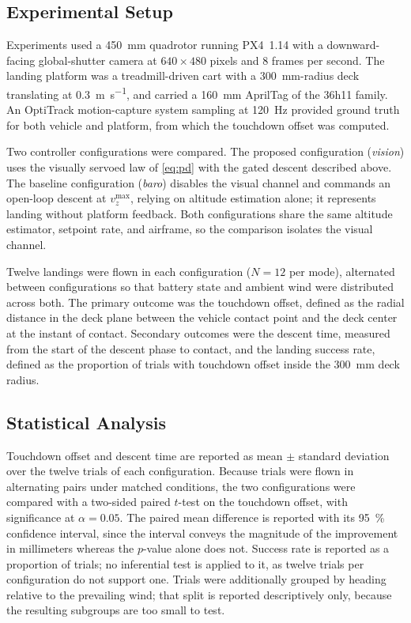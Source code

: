 \subsection{Experimental Setup}

Experiments used a \SI{450}{\milli\meter} quadrotor running PX4~1.14 with a
downward-facing global-shutter camera at $640 \times 480$ pixels and 8 frames
per second. The landing platform was a treadmill-driven cart with a
\SI{300}{\milli\meter}-radius deck translating at \SI{0.3}{\meter\per\second}, and
carried a \SI{160}{\milli\meter} AprilTag of the 36h11 family. An OptiTrack
motion-capture system sampling at \SI{120}{\hertz} provided ground truth for
both vehicle and platform, from which the touchdown offset was computed.

Two controller configurations were compared. The proposed configuration
(\textit{vision}) uses the visually servoed law of \eqref{eq:pd} with the gated
descent described above. The baseline configuration (\textit{baro}) disables the
visual channel and commands an open-loop descent at $v^{\max}_{z}$, relying on
altitude estimation alone; it represents landing without platform feedback. Both
configurations share the same altitude estimator, setpoint rate, and airframe, so
the comparison isolates the visual channel.

Twelve landings were flown in each configuration ($N=12$ per mode), alternated
between configurations so that battery state and ambient wind were distributed
across both. The primary outcome was the touchdown offset, defined as the radial
distance in the deck plane between the vehicle contact point and the deck center
at the instant of contact. Secondary outcomes were the descent time, measured
from the start of the descent phase to contact, and the landing success rate,
defined as the proportion of trials with touchdown offset inside the
\SI{300}{\milli\meter} deck radius.

\subsection{Statistical Analysis}

Touchdown offset and descent time are reported as mean $\pm$ standard deviation
over the twelve trials of each configuration. Because trials were flown in
alternating pairs under matched conditions, the two configurations were compared
with a two-sided paired $t$-test on the touchdown offset, with significance at
$\alpha = 0.05$. The paired mean difference is reported with its
\SI{95}{\percent} confidence interval, since the interval conveys the magnitude
of the improvement in millimeters whereas the $p$-value alone does not. Success
rate is reported as a proportion of trials; no inferential test is applied to it,
as twelve trials per configuration do not support one. Trials were additionally
grouped by heading relative to the prevailing wind; that split is reported
descriptively only, because the resulting subgroups are too small to test.

